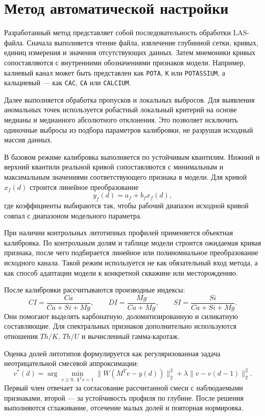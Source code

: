 \documentclass[master,summary]{pmk-graduate}
\begin{document}
\section{Метод автоматической настройки}

Разработанный метод представляет собой последовательность обработки LAS-файла. Сначала выполняется чтение файла, извлечение глубинной сетки, кривых, единиц измерения и значения отсутствующих данных. Затем мнемоники кривых сопоставляются с внутренними обозначениями признаков модели. Например, калиевый канал может быть представлен как \texttt{POTA}, \texttt{K} или \texttt{POTASSIUM}, а кальциевый --- как \texttt{CAC}, \texttt{CA} или \texttt{CALCIUM}.

Далее выполняется обработка пропусков и локальных выбросов. Для выявления аномальных точек используется робастный локальный критерий на основе медианы и медианного абсолютного отклонения. Это позволяет исключить одиночные выбросы из подбора параметров калибровки, не разрушая исходный массив данных.

В базовом режиме калибровка выполняется по устойчивым квантилям. Нижний и верхний квантили реальной кривой сопоставляются с минимальным и максимальным значениями соответствующего признака в модели. Для кривой $x_f(d)$ строится линейное преобразование
\[
    y_f(d)=a_f+b_f x_f(d),
\]
где коэффициенты выбираются так, чтобы рабочий диапазон исходной кривой совпал с диапазоном модельного параметра.

При наличии контрольных литотипных профилей применяется объектная калибровка. По контрольным долям и таблице модели строится ожидаемая кривая признака, после чего подбирается линейное или полиномиальное преобразование исходного канала. Такой режим используется не как обязательный вход метода, а как способ адаптации модели к конкретной скважине или месторождению.

После калибровки рассчитываются производные индексы:
\[
    CI=\frac{Ca}{Ca+Si+Mg}, \qquad
    DI=\frac{Mg}{Ca+Mg}, \qquad
    SI=\frac{Si}{Ca+Si+Mg}.
\]
Они помогают выделять карбонатную, доломитизированную и силикатную составляющие. Для спектральных признаков дополнительно используются отношения $Th/K$, $Th/U$ и вычисленный гамма-каротаж.

Оценка долей литотипов формулируется как регуляризованная задача неотрицательной смесевой аппроксимации:
\[
    v^*(d)=\arg\min_{v\ge0,\;\mathbf 1^Tv=1}
    \|W(M^Tv-y(d))\|_2^2+\lambda\|v-v(d-1)\|_2^2.
\]
Первый член отвечает за согласование рассчитанной смеси с наблюдаемыми признаками, второй --- за устойчивость профиля по глубине. После решения выполняются сглаживание, отсечение малых долей и повторная нормировка.
\end{document}
